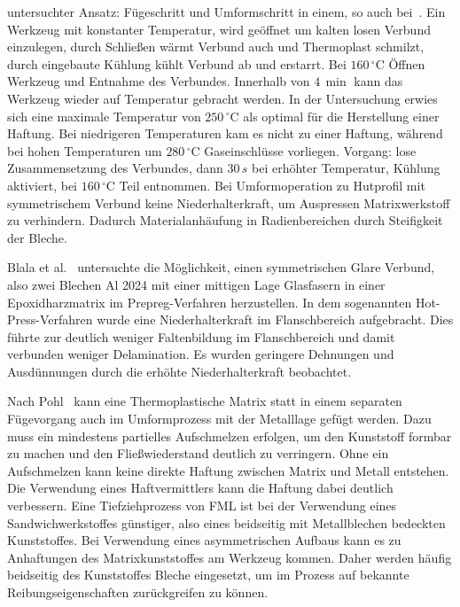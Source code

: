 untersuchter Ansatz: Fügeschritt und Umformschritt in einem, so auch bei~\cite{BerndArno.2017}.
Ein Werkzeug mit konstanter Temperatur, wird geöffnet um kalten losen Verbund einzulegen, durch Schließen wärmt Verbund auch und Thermoplast schmilzt, durch eingebaute Kühlung kühlt Verbund ab und erstarrt. Bei $160 \, ^\circ \text{C}$ Öffnen Werkzeug und Entnahme des Verbundes.
Innerhalb von $4\, \min$ kann das Werkzeug wieder auf Temperatur gebracht werden.
In der Untersuchung erwies sich eine maximale Temperatur von $250 \, ^\circ \text{C}$ als optimal für die Herstellung einer Haftung.
Bei niedrigeren Temperaturen kam es nicht zu einer Haftung, während bei hohen Temperaturen um $280 \, ^\circ \text{C}$ Gaseinschlüsse vorliegen.
Vorgang: lose Zusammensetzung des Verbundes, dann $30 \, s$ bei erhöhter Temperatur, Kühlung aktiviert, bei $160 \, ^\circ \text{C}$ Teil entnommen.
Bei Umformoperation zu Hutprofil mit symmetrischem Verbund keine Niederhalterkraft, um Auspressen Matrixwerkstoff zu verhindern.
Dadurch Materialanhäufung in Radienbereichen durch Steifigkeit der Bleche.

Blala et al.~\cite{Blala.2021} untersuchte die Möglichkeit, einen symmetrischen Glare Verbund, also zwei Blechen Al 2024 mit einer mittigen Lage Glasfasern in einer Epoxidharzmatrix im Prepreg-Verfahren herzustellen.
In dem sogenannten Hot-Press-Verfahren wurde eine Niederhalterkraft im Flanschbereich aufgebracht.
Dies führte zur deutlich weniger Faltenbildung im Flanschbereich und damit verbunden weniger Delamination.
Es wurden geringere Dehnungen und Ausdünnungen durch die erhöhte Niederhalterkraft beobachtet.

Nach Pohl~\cite{Pohl.2000} kann eine Thermoplastische Matrix statt in einem separaten Fügevorgang auch im Umformprozess mit der Metalllage gefügt werden.
Dazu muss ein mindestens partielles Aufschmelzen erfolgen, um den Kunststoff formbar zu machen und den Fließwiederstand deutlich zu verringern.
Ohne ein Aufschmelzen kann keine direkte Haftung zwischen Matrix und Metall entstehen.
Die Verwendung eines Haftvermittlers kann die Haftung dabei deutlich verbessern.
Eine Tiefziehprozess von FML ist bei der Verwendung eines Sandwichwerkstoffes günstiger, also eines beidseitig mit Metallblechen bedeckten Kunststoffes.
Bei Verwendung eines asymmetrischen Aufbaus kann es zu Anhaftungen des Matrixkunststoffes am Werkzeug kommen.
Daher werden häufig beidseitig des Kunststoffes Bleche eingesetzt, um im Prozess auf bekannte Reibungseigenschaften zurückgreifen zu können.~\cite{Behrens.2014}



